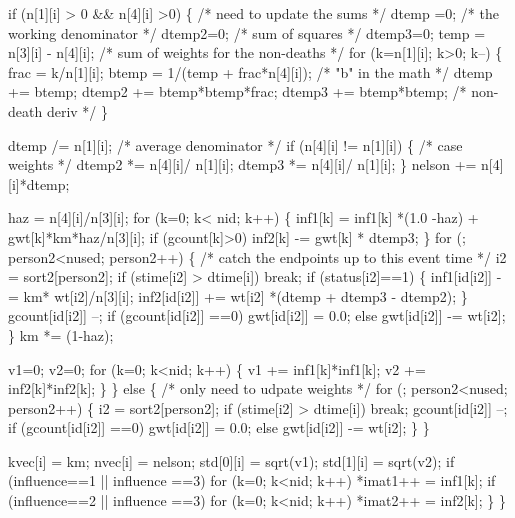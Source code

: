 \documentclass{article}
\begin{document}
\begin{nwchunk}
         if (n[1][i] > 0 && n[4][i] >0) \{ /* need to update the sums */
             dtemp =0;  /* the working denominator */
             dtemp2=0;  /* sum of squares */
             dtemp3=0;
             temp = n[3][i] - n[4][i];  /* sum of weights for the non-deaths */
             for (k=n[1][i]; k>0; k--) \{
                 frac = k/n[1][i];
                 btemp = 1/(temp + frac*n[4][i]);  /* "b" in the math */
                 dtemp += btemp;
                 dtemp2 += btemp*btemp*frac;
                 dtemp3 += btemp*btemp;    /* non-death deriv */
             \}
 
             dtemp /=  n[1][i];        /* average denominator */
             if (n[4][i] != n[1][i]) \{ /* case weights */
                 dtemp2 *= n[4][i]/ n[1][i];
                 dtemp3 *= n[4][i]/ n[1][i];
             \}
             nelson += n[4][i]*dtemp;
 
             haz = n[4][i]/n[3][i];
             for (k=0; k< nid; k++) \{
                 inf1[k] = inf1[k] *(1.0 -haz) + gwt[k]*km*haz/n[3][i];
                 if (gcount[k]>0) inf2[k] -= gwt[k] * dtemp3;
             \}
             for (; person2<nused; person2++) \{                
                 /* catch the endpoints up to this event time */
                 i2 = sort2[person2];
                 if (stime[i2] > dtime[i]) break;
                 if (status[i2]==1) \{
                     inf1[id[i2]] -= km* wt[i2]/n[3][i];
                     inf2[id[i2]] += wt[i2] *(dtemp + dtemp3 - dtemp2);
                  \}
                 gcount[id[i2]] --;
                 if (gcount[id[i2]] ==0) gwt[id[i2]] = 0.0;
                 else gwt[id[i2]] -= wt[i2];
             \}
             km *= (1-haz);
             
             v1=0; v2=0;
             for (k=0; k<nid; k++) \{
                 v1 += inf1[k]*inf1[k];
                 v2 += inf2[k]*inf2[k];
             \}
         \} else \{  /* only need to udpate weights */
             for (; person2<nused; person2++) \{ 
                 i2 = sort2[person2];
                 if (stime[i2] > dtime[i]) break;
                 gcount[id[i2]] --;
                 if (gcount[id[i2]] ==0) gwt[id[i2]] = 0.0;
                 else gwt[id[i2]] -= wt[i2];
             \}
         \}
  
         kvec[i] = km;
         nvec[i] = nelson;
         std[0][i] = sqrt(v1);
         std[1][i] = sqrt(v2);
         if (influence==1 || influence ==3) 
             for (k=0; k<nid; k++) *imat1++ = inf1[k];
         if (influence==2 || influence ==3)
             for (k=0; k<nid; k++) *imat2++ = inf2[k];
     \}
 \}
 

\end{nwchunk}
\end{document}
